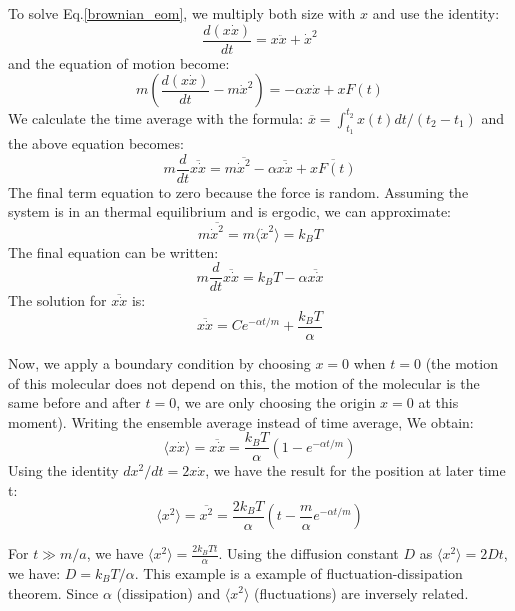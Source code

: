 \documentclass{article}
\begin{document}
To solve Eq.\ref{brownian_eom}, we multiply both size with $x$ and use the identity:
\begin{equation}
    \frac{d(x\dot{x})}{dt} = x \ddot{x} + \dot{x}^2
\end{equation}
and the equation of motion become:
\begin{equation}
    m \left( \frac{d(x\dot{x})}{dt} - m \dot{x}^2 \right) = - \alpha x \dot{x} + x F(t)
\end{equation}
We calculate the time average with the formula:
$ \overline{x} = \int_{t_1}^{t_2} x(t) dt / (t_2 - t_1)$
and the above equation becomes:
\begin{equation}
    m \frac{d}{dt} \overline{x\dot{x}} = m \overline{ \dot{x}^2 } 
    - \alpha \overline{ x \dot{x} } + \overline{ x F(t) }
\end{equation}
The final term equation to zero because the force is random. Assuming the 
system is in an thermal equilibrium and is ergodic, we can approximate:
\begin{equation}
    m \overline{ \dot{x}^2 } = m \langle \dot{x}^2\rangle = k_B T
\end{equation}
The final equation can be written:
\begin{equation}
    m \frac{d}{dt} \overline{x\dot{x}} = k_B T
    - \alpha \overline{ x \dot{x} } 
\end{equation}
The solution for $\overline{ x \dot{x} }$ is:
\begin{equation}
    \overline{ x \dot{x} } = C e^{-\alpha t/m} + \frac{k_B T}{\alpha}
\end{equation}

Now, we apply a boundary condition by choosing $x = 0$ when $t = 0$ 
(the motion of this molecular does not depend on this, the motion of the molecular
is the same before and after $t=0$, we are only choosing the origin $x = 0$ at this 
moment). Writing the ensemble average instead of time average, We obtain:
\begin{equation}
   \langle x \dot{x} \rangle = \overline{ x \dot{x} } = \frac{k_B T}{\alpha}( 1 - e^{-\alpha t/m})
\end{equation}
Using the identity $dx^2 / dt = 2x \dot{x}$, we have the result for the 
position at later time t:
\begin{equation}
    \langle x^2 \rangle = \overline{x^2} = \frac{2 k_B T}{\alpha}( t - \frac{m}{\alpha} e^{-\alpha t/m})
\end{equation}

For $t \gg m/a$, we have $ \langle x^2 \rangle = \frac{2k_B Tt}{\alpha} $. Using the diffusion 
constant $D$ as $ \langle x^2 \rangle = 2 D t $, we have: $ D = k_B T /\alpha $. This example is 
a example of fluctuation-dissipation theorem. Since $\alpha$ (dissipation) and $\langle x^2 \rangle$ 
(fluctuations) are inversely related.
\end{document}
